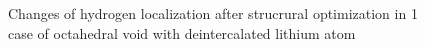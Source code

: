 \begin{figure}[h]
\begin{minipage}[h]{0.49\linewidth}
\end{minipage}
\hfill
\begin{minipage}[h]{0.49\linewidth}
\end{minipage}
\caption{Changes of hydrogen localization after strucrural optimization in 1 case of octahedral void with deintercalated lithium atom}
\label{ris:oct1-Li}
\end{figure}

